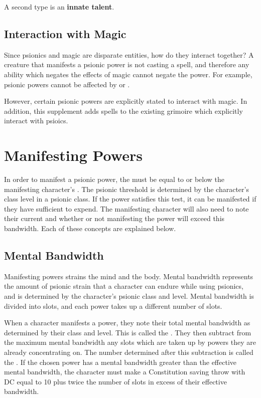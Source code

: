 A second type is an \textbf{innate talent}.

\subsection{Interaction with Magic}
Since psionics and magic are disparate entities,
how do they interact together?
A creature that manifests a psionic power is not
casting a spell,
and therefore any ability which negates the effects
of magic cannot negate the power.
For example, psionic powers cannot be affected by
 or .

However, certain psionic powers are explicitly stated
to interact with magic.
In addition, this supplement adds spells to the existing
grimoire which explicitly interact with psioics.

\section{Manifesting Powers}
In order to manifest a psionic power,
the  must be equal to or below
the manifesting character's .
The psionic threshold is determined by the character's class level
in a psionic class.
If the power satisfies this test,
it can be manifested if they have sufficient 
to expend.
The manifesting character will also need to note their
current  and whether or not manifesting
the power will exceed this bandwidth.
Each of these concepts are explained below.

\subsection{Mental Bandwidth}
Manifesting powers strains the mind and the body.
Mental bandwidth represents the amount of psionic strain that
a character can endure while using psionics,
and is determined by the character's psionic class and level.
Mental bandwidth is divided into slots,
and each power takes up a different number of slots.

When a character manifests a power,
they note their total mental bandwidth
as determined by their class and level.
This is called the
.
They then subtract from the maximum mental bandwidth
any slots which are taken up by powers they are already concentrating on.
The number determined after this subtraction is called the
.
If the chosen power has a mental bandwidth
greater than the effective mental bandwidth,
the character must make a Constitution saving throw
with DC equal to 10
plus twice the number of slots in excess of their effective bandwidth.


